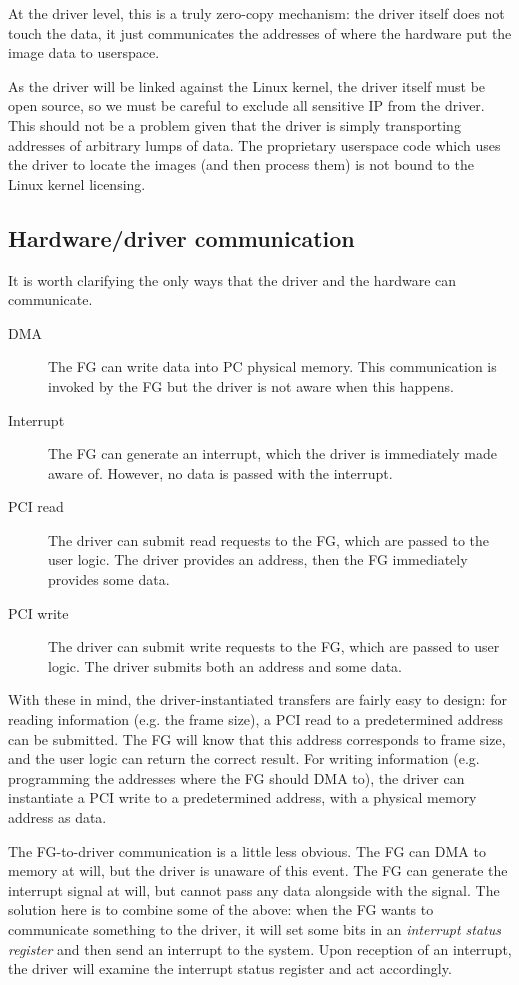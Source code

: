 \documentclass[12pt]{article}
\begin{document}
At the driver level, this is a truly zero-copy mechanism: the driver itself does not touch the data, it just communicates the addresses of where the hardware put the image data to userspace.

As the driver will be linked against the Linux kernel, the driver itself must be open source, so we must be careful to exclude all sensitive IP from the driver. This should not be a problem given that the driver is simply transporting addresses of arbitrary lumps of data. The proprietary userspace code which uses the driver to locate the images (and then process them) is not bound to the Linux kernel licensing.

\subsection{Hardware/driver communication}

It is worth clarifying the only ways that the driver and the hardware can communicate.

\begin{description}
\item[DMA] The FG can write data into PC physical memory. This communication is invoked by the FG but the driver is not aware when this happens.
\item[Interrupt] The FG can generate an interrupt, which the driver is immediately made aware of. However, no data is passed with the interrupt.
\item[PCI read] The driver can submit read requests to the FG, which are passed to the user logic. The driver provides an address, then the FG immediately provides some data.
\item[PCI write] The driver can submit write requests to the FG, which are passed to user logic. The driver submits both an address and some data.
\end{description}

With these in mind, the driver-instantiated transfers are fairly easy to design: for reading information (e.g. the frame size), a PCI read to a predetermined address can be submitted. The FG will know that this address corresponds to frame size, and the user logic can return the correct result. For writing information (e.g. programming the addresses where the FG should DMA to), the driver can instantiate a PCI write to a predetermined address, with a physical memory address as data.

The FG-to-driver communication is a little less obvious. The FG can DMA to memory at will, but the driver is unaware of this event. The FG can generate the interrupt signal at will, but cannot pass any data alongside with the signal. The solution here is to combine some of the above: when the FG wants to communicate something to the driver, it will set some bits in an \textit{interrupt status register} and then send an interrupt to the system. Upon reception of an interrupt, the driver will examine the interrupt status register and act accordingly.
\end{document}
